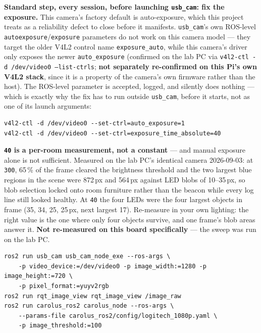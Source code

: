 \documentclass[11pt]{report}
\newenvironment{warningbox}%
  {\begin{lrbox}{\warnbox}\begin{minipage}{0.90\textwidth}}%
  {\end{minipage}\end{lrbox}%
   \begin{center}\fcolorbox{black}{codebg}{\usebox{\warnbox}}\end{center}}
\begin{document}
\textbf{Standard step, every session, before launching \texttt{usb\_cam}:
fix the exposure.} This camera's factory default is auto-exposure, which
this project treats as a reliability defect to close before it manifests.
\texttt{usb\_cam}'s own ROS-level \texttt{autoexposure}/\texttt{exposure}
parameters do not work on this camera model --- they target the older V4L2
control name \texttt{exposure\_auto}, while this camera's driver only
exposes the newer \texttt{auto\_exposure} (confirmed on the lab PC via
\texttt{v4l2-ctl -d /dev/video0 --list-ctrls}; \textbf{not separately
re-confirmed on this Pi's own V4L2 stack}, since it is a property of the
camera's own firmware rather than the host). The ROS-level parameter is
accepted, logged, and silently does nothing --- which is exactly why the fix
has to run outside \texttt{usb\_cam}, before it starts, not as one of its
launch arguments:

\begin{lstlisting}[style=shell]
v4l2-ctl -d /dev/video0 --set-ctrl=auto_exposure=1
v4l2-ctl -d /dev/video0 --set-ctrl=exposure_time_absolute=40
\end{lstlisting}

\begin{warningbox}
\textbf{\texttt{40} is a per-room measurement, not a constant} --- and
manual exposure alone is not sufficient. Measured on the lab PC's identical
camera 2026-09-03: at \texttt{300}, 65\,\% of the frame cleared the
brightness threshold and the two largest blue regions in the scene were
872\,px and 564\,px against LED blobs of 10--35\,px, so blob selection
locked onto room furniture rather than the beacon while every log line still
looked healthy. At \texttt{40} the four LEDs were the four largest objects
in frame (35, 34, 25, 25\,px, next largest 17). Re-measure in your own
lighting: the right value is the one where only four objects survive, and
one frame's blob areas answer it. \textbf{Not re-measured on this board
specifically} --- the sweep was run on the lab PC.
\end{warningbox}

\begin{lstlisting}[style=shell]
ros2 run usb_cam usb_cam_node_exe --ros-args \
    -p video_device:=/dev/video0 -p image_width:=1280 -p image_height:=720 \
    -p pixel_format:=yuyv2rgb
ros2 run rqt_image_view rqt_image_view /image_raw
ros2 run carolus_ros2 carolus_node --ros-args \
    --params-file carolus_ros2/config/logitech_1080p.yaml \
    -p image_threshold:=100
\end{lstlisting}
\end{document}
